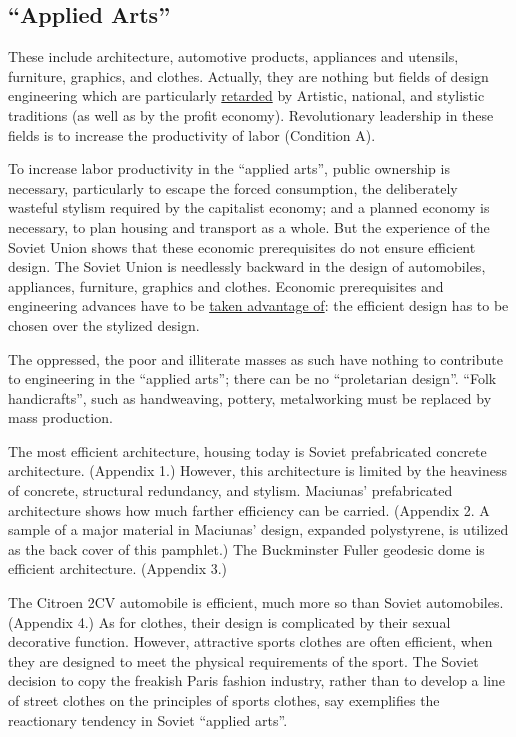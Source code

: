 \subsection*{\enquote{Applied Arts}}
These include architecture, automotive products, appliances and
utensils, furniture, graphics, and clothes. Actually, they are nothing
but fields of design engineering which are particularly \uline{retarded} 
by Artistic, national, and stylistic traditions (as well as by the profit
economy). Revolutionary leadership in these fields is to increase the
productivity of labor (Condition A). 

To increase labor productivity in the \enquote{applied arts}, public
ownership is necessary, particularly to escape the forced consumption,
the deliberately wasteful stylism required by the capitalist economy;
and a planned economy is necessary, to plan housing and transport as a
whole. But the experience of the Soviet Union shows that these economic
prerequisites do not ensure efficient design. The Soviet Union is 
needlessly backward in the design of automobiles, appliances, furniture,
graphics and clothes. Economic prerequisites and engineering advances
have to be \uline{taken advantage of}: the efficient design has to be chosen 
over the stylized design. 

The oppressed, the poor and illiterate masses as such have nothing to 
contribute to engineering in the \enquote{applied arts}; there can be no 
\enquote{proletarian design}. \enquote{Folk handicrafts}, such as handweaving, pottery,
metalworking must be replaced by mass production. 

The most efficient architecture, housing today is Soviet prefabricated
concrete architecture. (Appendix 1.) However, this architecture is 
limited by the heaviness of concrete, structural redundancy, and 
stylism. Maciunas' prefabricated architecture shows how much farther 
efficiency can be carried. (Appendix 2. A sample of a major material 
in Maciunas' design, expanded polystyrene, is utilized as the back 
cover of this pamphlet.) The Buckminster Fuller geodesic dome is efficient
architecture. (Appendix 3.) 

The Citroen 2CV automobile is efficient, much more so than Soviet 
automobiles. (Appendix 4.) As for clothes, their design is complicated by
their sexual decorative function. However, attractive sports clothes are
often efficient, when they are designed to meet the physical requirements of
the sport. The Soviet decision to copy the freakish Paris fashion industry,
rather than to develop a line of street clothes on the principles of sports
clothes, say exemplifies the reactionary tendency in Soviet \enquote{applied arts}. 

